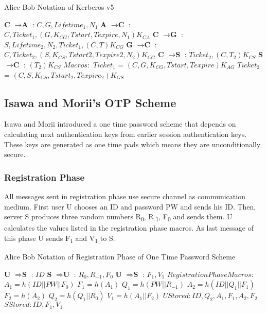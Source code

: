 \documentclass[a4paper, 12pt, titlepage]{article}
\begin{document}
\begin{algorithm}[H]
    \caption{Alice Bob Notation of Kerberos v5 \cite{avkerb}}
    \label{algo:kerberos}
    \begin{algorithmic}[1]
        \State \textbf{C} $ \rightarrow \textbf{A} $ : $C,G,Lifetime_1,N_1$
        \State \textbf{A} $ \rightarrow \textbf{C} $ : $C,Ticket_1,(G,K_{CG},Tstart,Texpire,N_1)K_{CA}$
        \State \textbf{C} $ \rightarrow \textbf{G} $ : $S,Lifetime_2,N_2,Ticket_1,(C,T)K_{CG}$
        \State \textbf{G} $ \rightarrow \textbf{C} $ : $C,Ticket_2,(S,K_{CS},Tstart2,Texpire2,N_2)K_{CG}$
        \State \textbf{C} $ \rightarrow \textbf{S} $ : $Ticket_2,(C,T_2)K_{CS}$
        \State \textbf{S} $ \rightarrow \textbf{C} $ : $(T_2)K_{CS}$
        \State  $ Macros: $
        \State $ Ticket_1  $ = $(C,G,K_{CG},Tstart,Texpire)K_{AG} $
 		\State  $ Ticket_2 $ = $(C,S,K_{CS},Tstart_2,Texpire_2)K_{GS} $
    \end{algorithmic}
\end{algorithm}
\subsection{Isawa and Morii's OTP Scheme}
Isawa and Morii introduced a one time password scheme\cite{otparticle} that depends on calculating next authentication keys from earlier session authentication keys. These keys are generated as one time pads which means they are unconditionally secure.
\subsubsection{Registration Phase}
All messages sent in registration phase use secure channel as communication medium. First user U chooses an ID and password PW and sends his ID. Then, server S produces three random numbers R\textsubscript{0}, R\textsubscript{-1}, F\textsubscript{0} and sends them. U calculates the values listed in the registration phase macros. As last message of this phase U sends F\textsubscript{1} and V\textsubscript{1} to S.

\begin{algorithm}[H]
    \caption{Alice Bob Notation of Registration Phase of One Time Password Scheme \cite{otparticle}}
    \label{algo:otpreg}
    \begin{algorithmic}[1]
        \State \textbf{U} $ \Rightarrow \textbf{S} $ : $ID$
        \State \textbf{S} $ \Rightarrow \textbf{U} $ : $R_0,R_{-1},F_0$
        \State \textbf{U} $ \Rightarrow \textbf{S} $ : $F_1,V_1$
        \State $ Registration Phase Macros: $
        \State $A_1 = h( ID || PW || F_0 ) $
   		\State $F_1 = h( A_1 )$
    	\State $Q_1 = h( PW || R_{-1} )$
    	\State $A_2 = h( ID || Q_1 || F_1 )$
    	\State $F_2 = h( A_2 )$
    	\State $Q_2 = h( Q_1 || R_0 )$
    	\State $V_1 = h( A_1 || F_2 )$
        \State $ U Stored: ID,Q_2,A_1,F_1,A_2,F_2 $
        \State $ S Stored: ID,F_1,V_1 $
    \end{algorithmic}
\end{algorithm}
\end{document}
